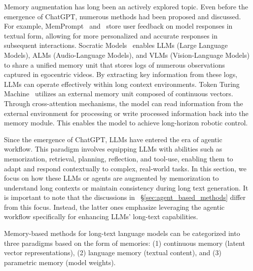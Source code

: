 \documentclass[11pt, a4paper, logo, copyright, nonumbering]{map}
\begin{document}
Memory augmentation has long been an actively explored topic. Even before the emergence of ChatGPT, numerous methods had been proposed and discussed. For example, 
MemPrompt~\citep{memprompt} and~\cite{towards-teachable-reasoning-systems} store user feedback on model responses in textual form, allowing for more personalized and accurate responses in subsequent interactions. 
Socratic Models~\citep{zeng2022socratic} enables LLMs (Large Language Models), ALMs (Audio-Language Models), and VLMs (Vision-Language Models) to share a unified memory unit that stores logs of numerous observations captured in egocentric videos. By extracting key information from these logs, LLMs can operate effectively within long context environments. 
Token Turing Machine~\citep{token-turing-machine} utilizes an external memory unit composed of continuous vectors. Through cross-attention mechanisms, the model can read information from the external environment for processing or write processed information back into the memory module. This enables the model to achieve long-horizon robotic control. 

Since the emergence of ChatGPT, LLMs have entered the era of agentic workflow. This paradigm involves equipping LLMs with abilities such as memorization, retrieval, planning, reflection, and tool-use, enabling them to adapt and respond contextually to complex, real-world tasks. 
In this section, we focus on how these LLMs or agents are augmented by memorization to understand long contexts or maintain consistency during long text generation. It is important to note that the discussions in ~\S\ref{sec:agent_based_methods} differ from this focus. 
Instead, the latter ones emphasize leveraging the agentic workflow specifically for enhancing LLMs’ long-text capabilities.

Memory-based methods for long-text language models can be categorized into three paradigms based on the form of memories: (1) continuous memory (latent vector representations), (2) language memory (textual content), and (3) parametric memory (model weights).
\end{document}
